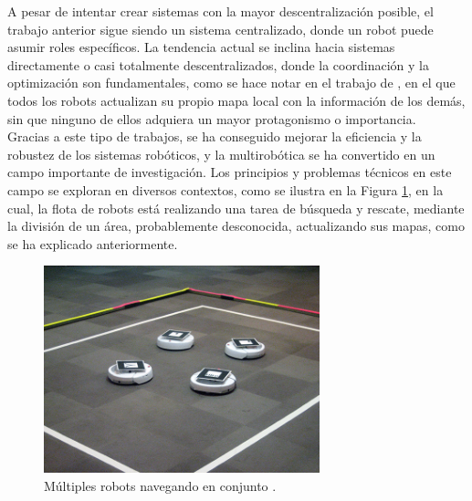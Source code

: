 A pesar de intentar crear sistemas con la mayor descentralización posible, el
trabajo anterior sigue siendo un sistema centralizado, donde un robot puede
asumir roles específicos.
La tendencia actual se inclina hacia sistemas directamente o casi totalmente
descentralizados, donde la coordinación y la optimización son fundamentales,
como se hace notar en el trabajo de \cite{Sheng2006}, en el que todos los robots
actualizan su propio mapa local con la información de los demás, sin que ninguno
de ellos adquiera un mayor protagonismo o importancia.
\\

Gracias a este tipo de trabajos, se ha conseguido mejorar la eficiencia y la
robustez de los sistemas robóticos, y la multirobótica se ha convertido en un
campo importante de investigación.
Los principios y problemas técnicos en este campo se exploran en diversos
contextos, como se ilustra en la Figura \ref{fig:multirobots}, en la cual, la
flota de robots está realizando una tarea de búsqueda y rescate, mediante la
división de un área, probablemente desconocida, actualizando sus mapas, como
se ha explicado anteriormente.

\begin{figure} [h!]
  \begin{center}
    \includegraphics[width=8cm]{figs/multirobotics_navigation}
  \end{center}
  \caption{Múltiples robots navegando en conjunto \cite{multirobot_navigation}.}
  \label{fig:multirobots}
\end{figure}\

